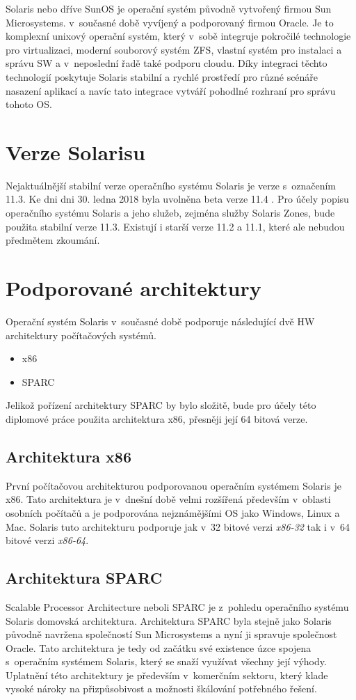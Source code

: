 \label{chapter:solaris}
Solaris nebo dříve SunOS je operační systém původně vytvořený firmou Sun Microsystems. v~současné době vyvíjený a podporovaný
firmou Oracle. Je to komplexní unixový operační systém, který v~sobě integruje pokročilé technologie pro virtualizaci, moderní
souborový systém ZFS, vlastní systém pro instalaci a správu SW a v~neposlední řadě také podporu cloudu. Díky integraci těchto
technologií poskytuje Solaris stabilní a rychlé prostředí pro různé scénáře nasazení aplikací a navíc tato integrace vytváří
pohodlné rozhraní pro správu tohoto OS. 
\section{Verze Solarisu}
\label{chapter:solaris:version}
Nejaktuálnější stabilní verze operačního systému Solaris je verze s~označením 11.3. Ke dni dni 30. ledna 2018 byla uvolněna beta
verze 11.4 \cite{oracle:solaris:beta}. Pro účely popisu operačního systému Solaris a jeho služeb, zejména služby Solaris Zones,
bude použita stabilní verze 11.3. Existují i starší verze 11.2 a 11.1, které ale nebudou předmětem zkoumání.
\section{Podporované architektury}
\label{chapter:solaris:support}
Operační systém Solaris v~současné době podporuje následující dvě HW architektury počítačových systémů.
\begin{itemize}
 \item x86
 \item SPARC
\end{itemize}
Jelikož pořízení architektury SPARC by bylo složitě, bude pro účely této diplomové práce použita architektura x86, přesněji
její 64 bitová verze.
\subsection{Architektura x86}
\label{chapter:solaris:support:x86}
První počítačovou architekturou podporovanou operačním systémem Solaris je x86. Tato architektura je v~dnešní době velmi rozšířená
především v~oblasti osobních počítačů a je podporována nejznámějšími OS jako Windows, Linux a Mac. Solaris tuto architekturu
podporuje jak v~32 bitové verzi \textit{x86-32} tak i v~64 bitové verzi \textit{x86-64}.
\subsection{Architektura SPARC}
\label{chapter:solaris:support:sparc}
Scalable Processor Architecture neboli SPARC je z~pohledu operačního systému Solaris domovská architektura. Architektura SPARC
byla stejně jako Solaris původně navržena společností Sun Microsystems a nyní ji spravuje společnost Oracle. Tato architektura
je tedy od začátku své existence úzce spojena s~operačním systémem Solaris, který se snaží využívat všechny její výhody.
Uplatnění této architektury je především v~komerčním sektoru, který klade vysoké nároky na přizpůsobivost a možnosti škálování
potřebného řešení.
